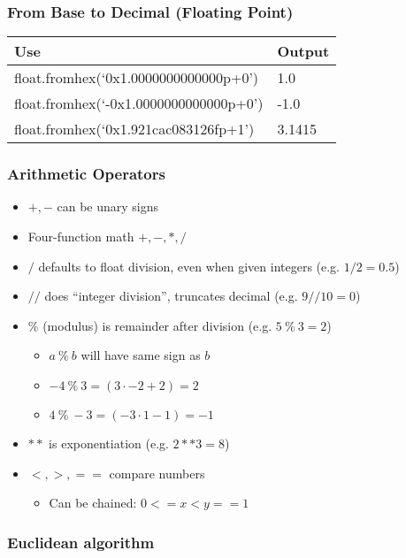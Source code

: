 \documentclass{beamer}
\begin{document}
\begin{frame}
  \frametitle{From Base to Decimal (Floating Point)}

  \begin{table}
    \begin{tabular}{l | l}
    Use          & Output   \\
    \hline
    float.fromhex(`0x1.0000000000000p+0')    &  1.0    \\
    float.fromhex(`-0x1.0000000000000p+0')   & -1.0    \\
    float.fromhex(`0x1.921cac083126fp+1')    &  3.1415 \\
    \end{tabular}
  \end{table}
\end{frame}

\begin{frame}
  \frametitle{Arithmetic Operators}

  \begin{itemize}
  \item $+, -$ can be unary signs
  \item Four-function math $+, -, *, /$
  \item $/$ defaults to float division, even when given integers (e.g. $1/2=0.5$)
  \item $//$ does ``integer division'', truncates decimal (e.g. $9//10=0$)
  \item $\%$ (modulus) is remainder after division (e.g. $5 ~\%~ 3 = 2$)
    \begin{itemize}
      \item $a ~\%~ b$ will have same sign as $b$
      \item $-4 ~\%~ 3 = (3\cdot-2 + 2) = 2$
      \item $4 ~\%~ -3 = (-3\cdot1 - 1) = -1$
     \end{itemize}
  \item $**$ is exponentiation (e.g. $2**3=8$)
  \item $<, >, ==$ compare numbers
    \begin{itemize}
      \item Can be chained: $0 <= x < y == 1$
    \end{itemize}
  \end{itemize}
\end{frame}

\begin{frame}
  \frametitle{Euclidean algorithm}
\end{frame}
\end{document}
